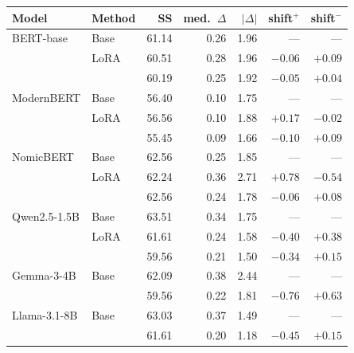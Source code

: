   \footnotesize\setlength{\tabcolsep}{4pt}
  \begin{tabular}{@{}llrrrrr@{}}
    \toprule
    Model & Method & SS & med.\ $\Delta$ & $|\Delta|$ & shift$^{+}$ & shift$^{-}$ \\
    \midrule
    BERT-base & Base & 61.14 & 0.26 & 1.96 & --- & --- \\
     & LoRA & 60.51 & 0.28 & 1.96 & $-0.06$ & $+0.09$ \\
     & \PEAT{} & 60.19 & 0.25 & 1.92 & $-0.05$ & $+0.04$ \\
    \midrule
    ModernBERT & Base & 56.40 & 0.10 & 1.75 & --- & --- \\
     & LoRA & 56.56 & 0.10 & 1.88 & $+0.17$ & $-0.02$ \\
     & \PEAT{} & 55.45 & 0.09 & 1.66 & $-0.10$ & $+0.09$ \\
    \midrule
    NomicBERT & Base & 62.56 & 0.25 & 1.85 & --- & --- \\
     & LoRA & 62.24 & 0.36 & 2.71 & $+0.78$ & $-0.54$ \\
     & \PEAT{} & 62.56 & 0.24 & 1.78 & $-0.06$ & $+0.08$ \\
    \midrule
    Qwen2.5-1.5B & Base & 63.51 & 0.34 & 1.75 & --- & --- \\
     & LoRA & 61.61 & 0.24 & 1.58 & $-0.40$ & $+0.38$ \\
     & \PEAT{} & 59.56 & 0.21 & 1.50 & $-0.34$ & $+0.15$ \\
    \midrule
    Gemma-3-4B & Base & 62.09 & 0.38 & 2.44 & --- & --- \\
     & \PEAT{} & 59.56 & 0.22 & 1.81 & $-0.76$ & $+0.63$ \\
    \midrule
    Llama-3.1-8B & Base & 63.03 & 0.37 & 1.49 & --- & --- \\
     & \PEAT{} & 61.61 & 0.20 & 1.18 & $-0.45$ & $+0.15$ \\
    \bottomrule
  \end{tabular}
